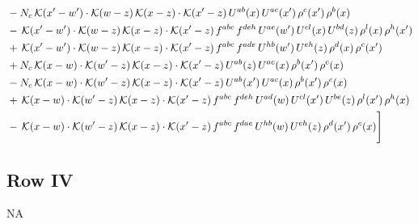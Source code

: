 \documentclass[9pt]{article}
\numberwithin{equation}{section}
\begin{document}
\begin{align}
&-N_{c}\,\mathcal{K}(x'-w')\cdot\mathcal{K}(w-z)\,\mathcal{K}(x-z)\cdot\mathcal{K}(x'-z)\,U^{ab}(x)\,U^{ac}(x')\,\rho^{c}(x')\,\rho^{b}(x)\notag \\
&-\,\mathcal{K}(x'-w')\cdot\mathcal{K}(w-z)\,\mathcal{K}(x-z)\cdot\mathcal{K}(x'-z)\,f^{abc}\,f^{deh}\,U^{ae}(w')\,U^{cl}(x)\,U^{bd}(z)\,\rho^{l}(x)\,\rho^{h}(x')\notag \\
&+\,\mathcal{K}(x'-w')\cdot\mathcal{K}(w-z)\,\mathcal{K}(x-z)\cdot\mathcal{K}(x'-z)\,f^{abc}\,f^{ade}\,U^{hb}(w')\,U^{eh}(z)\,\rho^{d}(x)\,\rho^{c}(x')\notag \\
&+N_{c}\,\mathcal{K}(x-w)\cdot\mathcal{K}(w'-z)\,\mathcal{K}(x-z)\cdot\mathcal{K}(x'-z)\,U^{ab}(z)\,U^{ac}(x)\,\rho^{b}(x')\,\rho^{c}(x)\notag \\
&-N_{c}\,\mathcal{K}(x-w)\cdot\mathcal{K}(w'-z)\,\mathcal{K}(x-z)\cdot\mathcal{K}(x'-z)\,U^{ab}(x')\,U^{ac}(x)\,\rho^{b}(x')\,\rho^{c}(x)\notag \\
&+\,\mathcal{K}(x-w)\cdot\mathcal{K}(w'-z)\,\mathcal{K}(x-z)\cdot\mathcal{K}(x'-z)\,f^{abc}\,f^{deh}\,U^{ad}(w)\,U^{cl}(x')\,U^{be}(z)\,\rho^{l}(x')\,\rho^{h}(x)\notag \\
&-\,\mathcal{K}(x-w)\cdot\mathcal{K}(w'-z)\,\mathcal{K}(x-z)\cdot\mathcal{K}(x'-z)\,f^{abc}\,f^{dae}\,U^{hb}(w)\,U^{eh}(z)\,\rho^{d}(x')\,\rho^{c}(x)\Bigg]
\end{align}
\subsection{Row IV}
\textsc{NA}
\end{document}
